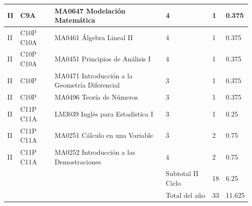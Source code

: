 \begin{longtable}[c]{|p{0.8cm}|p{1.8cm}|p{6.8cm}|p{1.5cm}|p{1.3cm}|p{1.5cm}|}
II & C9A & MA0647 Modelación Matemática & 4 & 1 & 0.375 \\ \hline
II & C10P C10A & MA0461 Álgebra Lineal II & 4 & 1 & 0.375 \\ \hline
II & C10P C10A & MA0451 Principios de Análisis I & 4 & 1 & 0.375 \\ \hline
II & C10P & MA0471 Introducción a la Geometría Diferencial & 3 & 1 & 0.375 \\ \hline
II & C10P & MA0496 Teoría de Números & 3 & 1 & 0.375 \\ \hline
II & C11P C11A & LM3039 Inglés para Estadística I & 3 & 1 & 0.25 \\ \hline
II & C11P C11A & MA0251 Cálculo en una Variable & 3 & 2 & 0.75 \\ \hline
II & C11P C11A & MA0252 Introducción a las Demostraciones & 4 & 2 & 0.75 \\ \hline
 &  &  & Subtotal II Ciclo & 18 & 6.25 \\ \hline
 &  &  & Total del año & 33 & 11.625 \\ \hline
\end{longtable}
